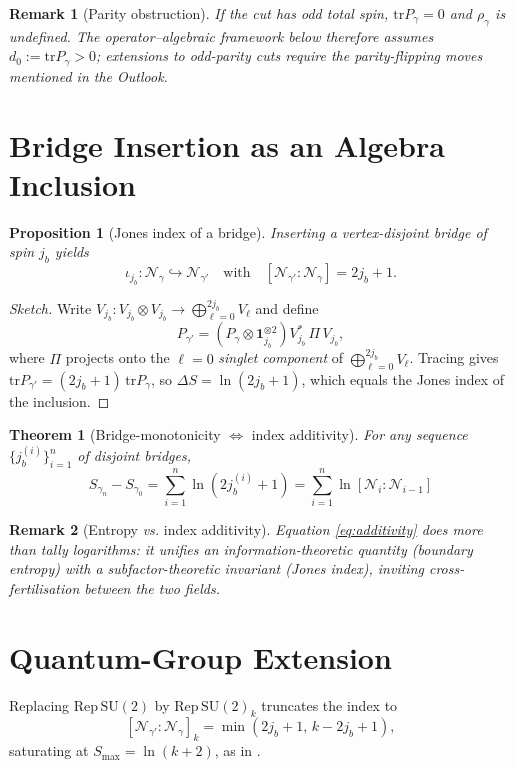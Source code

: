 \documentclass[11pt]{article}
\newtheorem{theorem}{Theorem}[section]
\newtheorem{proposition}{Proposition}[section]
\newtheorem{remark}{Remark}[section]
\begin{document}
\begin{remark}[Parity obstruction]\label{rem:parity}
If the cut has \emph{odd} total spin, $\mathrm{tr}P_{\gamma}=0$ and
$\rho_{\gamma}$ is undefined.
The operator–algebraic framework below therefore assumes
$d_0:=\mathrm{tr}P_{\gamma}>0$; extensions to odd-parity cuts require the
parity-flipping moves mentioned in the Outlook.
\end{remark}

\section{Bridge Insertion as an Algebra Inclusion}

\begin{proposition}[Jones index of a bridge]
Inserting a vertex-disjoint bridge of spin $j_b$ yields
\[
  \iota_{j_b}:\mathcal N_{\gamma}\hookrightarrow \mathcal N_{\gamma'}
\quad\text{with}\quad
  [\mathcal N_{\gamma'}:\mathcal N_{\gamma}] = 2j_b+1.
\]
\end{proposition}

\begin{proof}[Sketch]
Write
$V_{j_b}: V_{j_b}\!\otimes\! V_{j_b}\to
  \bigoplus_{\ell=0}^{2j_b}V_{\ell}$
and define
\[
  P_{\gamma'}=(P_{\gamma}\otimes\mathbf1_{j_b}^{\otimes2})
  V_{j_b}^{*}\,\Pi\,V_{j_b},
\]
where $\Pi$ projects onto the $\ell=0$ \emph{singlet component} of
$\bigoplus_{\ell=0}^{2j_b}V_{\ell}$.
Tracing gives
$\mathrm{tr}P_{\gamma'}=(2j_b+1)\,\mathrm{tr}P_{\gamma}$,
so $\Delta S=\ln(2j_b+1)$, which equals the Jones index of the inclusion.
\end{proof}

\begin{theorem}[Bridge-monotonicity $\Leftrightarrow$ index additivity]
For any sequence $\{j_b^{(i)}\}_{i=1}^{n}$ of disjoint bridges,
\[
  S_{\gamma_n}-S_{\gamma_0}
  =\sum_{i=1}^{n}\ln\!(2j_b^{(i)}+1)
  =\sum_{i=1}^{n}\ln[\mathcal N_i:\mathcal N_{i-1}]
  \tag{\thetheorem}\label{eq:additivity}
\]
\end{theorem}

\begin{remark}[Entropy \emph{vs.} index additivity]\label{rem:additivity}
Equation \eqref{eq:additivity} does more than tally logarithms:
it unifies an \emph{information-theoretic} quantity 
(boundary entropy) with a \emph{subfactor-theoretic} invariant 
(Jones index), inviting cross-fertilisation between the two fields.
\end{remark}

\section{Quantum-Group Extension}
Replacing $\mathrm{Rep}\,\mathrm{SU}(2)$ by $\mathrm{Rep}\,\mathrm{SU}(2)_k$
truncates the index to
\[
  [\mathcal N_{\gamma'}:\mathcal N_{\gamma}]_{k}
  =\min\!(2j_b+1,\,k-2j_b+1),
\]
saturating at $S_{\max}=\ln(k+2)$, as in \cite{EntropyMono}.
\end{document}
